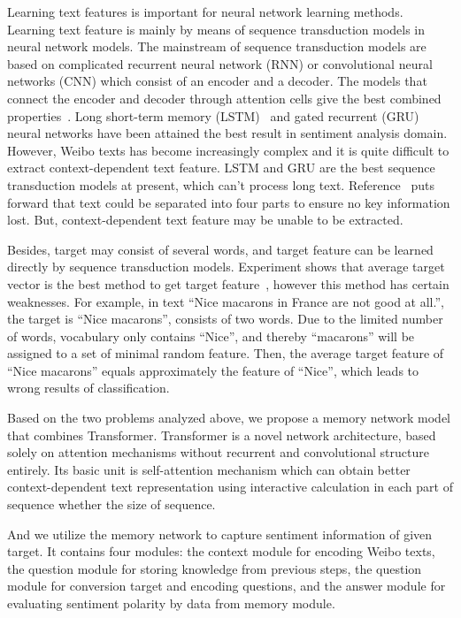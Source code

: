\documentclass[runningheads, twocolumn]{llncs}
\begin{document}
Learning text features is important for neural network learning methods. Learning text feature is mainly by means of sequence transduction models in neural network models. The mainstream of sequence transduction models are based on complicated recurrent neural network (RNN) or convolutional neural networks (CNN) which consist of an encoder and a decoder. The models that connect the encoder and decoder through attention cells give the best combined properties~\cite{DBLP:conf/nips/VaswaniSPUJGKP17}. Long short-term memory (LSTM)~\cite{DBLP:journals/neco/HochreiterS97} and gated recurrent (GRU)~\cite{DBLP:journals/corr/ChungGCB14} neural networks have been attained the best result in sentiment analysis domain. However, Weibo texts has become increasingly complex and it is quite difficult to extract context-dependent text feature. LSTM and GRU are the best sequence transduction models at present, which can’t process long text. Reference~\cite{DBLP:conf/naacl/SongSLZ18} puts forward that text could be separated into four parts to ensure no key information lost. But, context-dependent text feature may be unable to be extracted.

Besides, target may consist of several words, and target feature can be learned directly by sequence transduction models. Experiment shows that average target vector is the best method to get target feature~\cite{DBLP:journals/eswa/DoPMA19}, however this method has certain weaknesses. For example, in text “Nice macarons in France are not good at all.”, the target is “Nice macarons”, consists of two words. Due to the limited number of words, vocabulary only contains “Nice”, and thereby “macarons” will be assigned to a set of minimal random feature. Then, the average target feature of “Nice macarons” equals approximately the feature of “Nice”, which leads to wrong results of classification.

Based on the two problems analyzed above, we propose a memory network model that combines Transformer. Transformer is a novel network architecture, based solely on attention mechanisms without recurrent and convolutional structure entirely. Its basic unit is self-attention mechanism which can obtain better context-dependent text representation using interactive calculation in each part of sequence whether the size of sequence.

And we utilize the memory network to capture sentiment information of given target. It contains four modules: the context module for encoding Weibo texts, the question module for storing knowledge from previous steps, the question module for conversion target and encoding questions, and the answer module for evaluating sentiment polarity by data from memory module.
\end{document}
